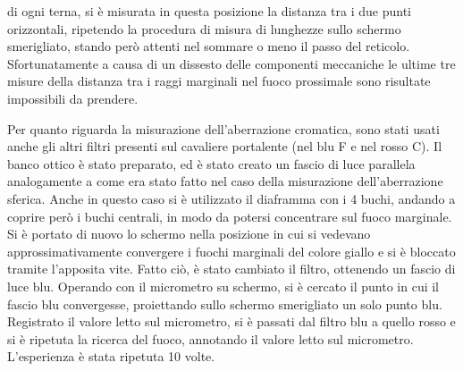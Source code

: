 di ogni terna, si è misurata in questa posizione la distanza tra i due punti orizzontali, ripetendo la procedura di misura di lunghezze sullo schermo smerigliato, stando però attenti nel sommare o meno il passo del reticolo.
Sfortunatamente a causa di un dissesto delle componenti meccaniche le ultime tre misure della distanza tra i raggi marginali nel fuoco prossimale sono risultate impossibili da prendere.


Per quanto riguarda la misurazione dell'aberrazione cromatica, sono stati usati anche gli altri filtri presenti sul cavaliere portalente (nel blu F e nel rosso C). Il banco ottico è stato preparato, ed è stato creato un fascio di luce parallela analogamente a come era stato fatto nel caso della misurazione dell'aberrazione sferica. Anche in questo caso si è utilizzato il diaframma con i 4 buchi, andando a coprire però i buchi centrali, in modo da potersi concentrare sul fuoco marginale. Si è portato di nuovo lo schermo nella posizione in cui si vedevano approssimativamente convergere i fuochi marginali del colore giallo e si è bloccato tramite l'apposita vite. Fatto ciò, è stato cambiato il filtro, ottenendo un fascio di luce blu. Operando con il micrometro su schermo, si è cercato il punto in cui il fascio blu convergesse, proiettando sullo schermo smerigliato un solo punto blu. Registrato il valore letto sul micrometro, si è passati dal filtro blu a quello rosso e si è ripetuta la ricerca del fuoco, annotando il valore letto sul micrometro. L'esperienza è stata ripetuta 10 volte.
